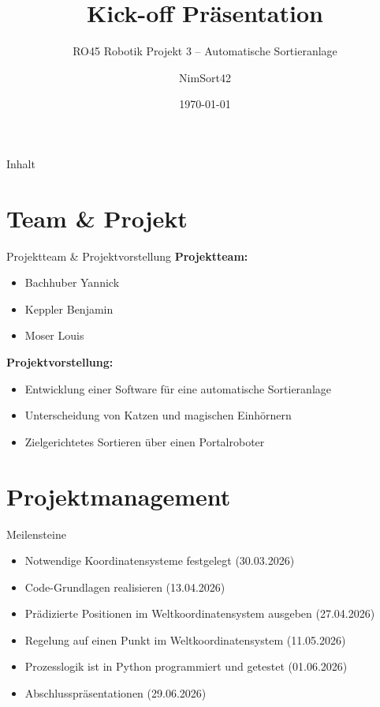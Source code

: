 \documentclass[aspectratio=169]{beamer}
\title[Kurztitel]{Kick-off Präsentation}
\subtitle{RO45 Robotik Projekt 3 – Automatische Sortieranlage}
\author{NimSort42}
\institute{Hochschule Kempten}
\date{\today}
\begin{document}
	
	\begin{frame}
		\titlepage
	\end{frame}
	
	\begin{frame}{Inhalt}
		\tableofcontents
	\end{frame}
	
	\section{Team \& Projekt}
	
	\begin{frame}{Projektteam \& Projektvorstellung}
		\textbf{Projektteam:}
		\begin{itemize}
			\item Bachhuber Yannick
			\item Keppler Benjamin
			\item Moser Louis
		\end{itemize}
		
		\vspace{6mm}
		
		\textbf{Projektvorstellung:}
		\begin{itemize}
			\item Entwicklung einer Software für eine automatische Sortieranlage
			\item Unterscheidung von Katzen und magischen Einhörnern
			\item Zielgerichtetes Sortieren über einen Portalroboter
		\end{itemize}
	\end{frame}
	
	\section{Projektmanagement}
	
	\begin{frame}{Meilensteine}
		\begin{itemize}
			\item Notwendige Koordinatensysteme festgelegt (30.03.2026)
			\item Code-Grundlagen realisieren (13.04.2026)
			\item Prädizierte Positionen im Weltkoordinatensystem ausgeben (27.04.2026)
			\item Regelung auf einen Punkt im Weltkoordinatensystem (11.05.2026)
			\item Prozesslogik ist in Python programmiert und getestet (01.06.2026)
			\item Abschlusspräsentationen (29.06.2026)
		\end{itemize}
	\end{frame}
	
\end{document}
